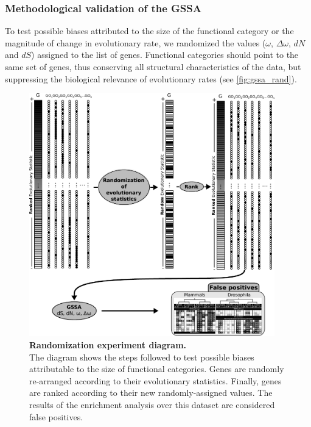 \subsubsection{Methodological validation of the GSSA}
\label{sec:meth-valid-gssa}

To test possible biases attributed to the size of the functional category or the magnitude of change in evolutionary rate, we randomized the values ($\omega$, $\Delta\omega$, $dN$ and $dS$) assigned to the list of genes. Functional categories should point to the same set of genes, thus conserving all structural characteristics of the data, but suppressing the biological relevance of evolutionary rates (see  \autoref{fig:gssa_rand}).

\begin{figure}[!ht]
\centering
 \includegraphics[width=0.95\textwidth]{figures/material_methods/random_met.pdf}
 \caption[Randomization experiment diagram]{
   {\bf Randomization experiment diagram.}\\
   The diagram shows the steps followed to test possible biases attributable to the size of functional categories. Genes are randomly re-arranged according to their evolutionary statistics. Finally, genes are ranked according to their new randomly-assigned values. The results of the enrichment analysis over this dataset are considered false positives.}
\label{fig:gssa_rand}
\end{figure}

